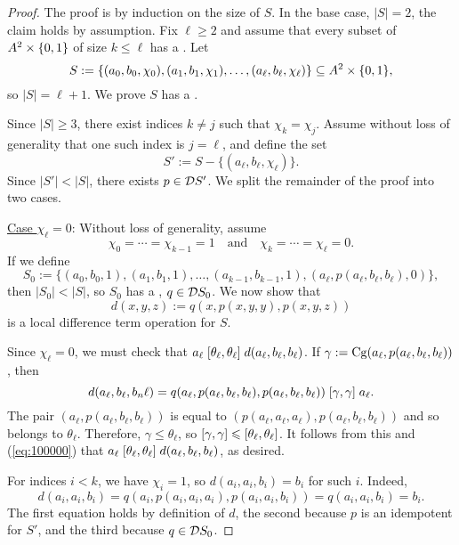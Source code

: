 \documentclass{ws-ijac}
\newcommand{\mysetminus}{\ensuremath{-}}
\begin{document}
\begin{proof}

The proof is by induction on the size of $S$.  In the base case,
$|S| = 2$, the claim holds by assumption. Fix $\ell\geq 2$ and assume that
every subset of $A^2 \times \{0,1\}$ of size $k \leq \ell$ has a \ldto. Let
\[
S := \{(a_0, b_0, \chi_0), (a_1, b_1, \chi_1), \dots,
        (a_{\ell}, b_{\ell},\chi_{\ell})\} \subseteq A^2 \times \{0,1\},
\]
so $|S| = \ell+1$.  We prove $S$ has a \ldto.

Since $|S| \geq 3$, %
there exist indices $k\neq j$ such that $\chi_k = \chi_j$.
Assume without loss of generality that one such index is $j=\ell$,
and define the set
\[
S' := S \mysetminus \{(a_\ell, b_\ell, \chi_\ell)\}.
\]
Since $|S'| < |S|$, there exists $p \in \mathcal{D} S'$.
We split the remainder of the proof into two cases.

\medskip


\newcommand{\thetal}{\ensuremath{\theta_{\ell}}}
\noindent \underline{Case $\chi_\ell = 0$}:
Without loss of generality, assume
\begin{equation*}
  \chi_0 = %
\cdots =\chi_{k-1} = 1 \quad \text{and} \quad
\chi_{k} = \cdots = \chi_{\ell} = 0.
\end{equation*}
If we define %
\[S_0 := \{(a_0, b_0, 1), (a_1, b_1, 1),
\dots, (a_{k-1}, b_{k-1}, 1), (a_\ell, p(a_\ell, b_\ell, b_\ell), 0)\},\]
then $|S_0| < |S|$, so $S_0$ has a \ldto, $q \in \mathcal{D} S_0$.
We now show that
\[
d(x,y,z) := q(x, p(x,y,y), p(x,y,z))
\]
is a local difference term operation for $S$.

Since $\chi_\ell =0$, we must check that
$a_\ell \comr{\thetal} d(a_\ell,b_\ell,b_\ell)$.
If $\gamma := \operatorname{Cg}(a_\ell, p(a_\ell,b_\ell,b_\ell))$, then
\begin{equation}
    \label{eq:100000}
  d(a_\ell,b_\ell,b_n\ell) =
  q(a_\ell, p(a_\ell,b_\ell,b_\ell), p(a_\ell,b_\ell,b_\ell))\comr{\gamma} a_\ell.
\end{equation}
The pair $(a_\ell, p(a_\ell,b_\ell,b_\ell))$ is equal to
$(p(a_\ell,a_\ell,a_\ell), p(a_\ell,b_\ell,b_\ell))$ and so
belongs to $\thetal$.
Therefore, $\gamma\leq \thetal$, so
$\com{\gamma} \leq \com{\thetal}$.
It follows from this and (\ref{eq:100000}) that
$a_\ell \comr{\thetal} d(a_\ell,b_\ell,b_\ell)$, as desired.

For indices $i < k$, we have $\chi_i =1$, so
$d(a_i,a_i,b_i) = b_i$ for such $i$. Indeed,
\[
  d(a_i,a_i,b_i) =
  q(a_i, p(a_i,a_i,a_i), p(a_i,a_i,b_i)) %
  =q(a_i, a_i, b_i) %
  =b_i. %
\]
The first equation holds by definition of $d$, the second
because $p$ is an idempotent \ldto for
$S'$, and the third because $q \in \mathcal{D} S_0$.


\end{proof}
\end{document}
